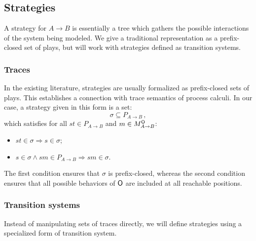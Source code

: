 

\subsection{Strategies} %

A strategy for $A \rightarrow B$
is essentially a tree
which gathers the possible interactions of
the system being modeled.
We give a traditional representation
as a prefix-closed set of plays,
but will work with strategies defined as transition systems.

\subsubsection{Traces} %

In the existing literature,
strategies are usually formalized as prefix-closed sets of plays.
This establishes a connection with trace semantics of process calculi.
In our case,
a strategy given in this form is a set:
\[ \sigma \subseteq P_{A \rightarrow B} \,, \]
which satisfies
for all $st \in P_{A \rightarrow B}$
and $m \in M_{A \rightarrow B}^{ \mathsf{O} }$:
\begin{itemize}
  \item $st \in \sigma \Rightarrow s \in \sigma$;
  \item $s \in \sigma \wedge sm \in P_{A \rightarrow B}
    \Rightarrow sm \in \sigma$.
\end{itemize}
The first condition ensures that $\sigma$ is prefix-closed,
whereas the second condition ensures that
all possible behaviors of $ \mathsf{O} $ are included
at all reachable positions.


\subsubsection{Transition systems} %

Instead of manipulating sets of traces directly,
we will define strategies using a specialized form of transition system.

